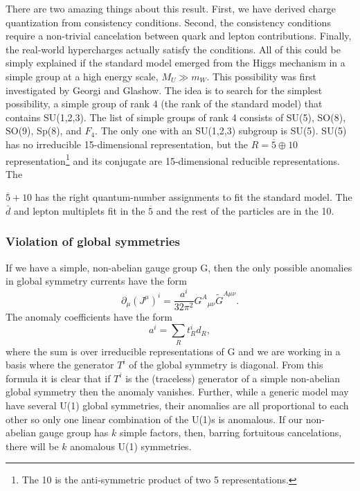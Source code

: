 
There are two amazing things about this result. First, we have derived charge
quantization from consistency conditions. Second, the consistency conditions
require a non-trivial cancelation between quark and lepton contributions.
Finally, the real-world hypercharges actually satisfy the conditions. All of
this could be simply explained if the standard model emerged from the Higgs
mechanism in a simple group at a high energy scale, $M_U\gg m_W$. This
possibility was first investigated by Georgi and Glashow. The idea is to search
for the simplest possibility, a simple group of rank 4 (the rank of the
standard model) that contains SU(1,2,3). The list of simple groups of rank 4
consists of SU(5), SO(8), SO(9), Sp(8), and $F_4$. The only one with an
SU(1,2,3) subgroup is SU(5). SU(5) has no irreducible 15-dimensional
representation, but the $R=\overline{5}\oplus10$ representation\footnote[17]{The
10 is the anti-symmetric product of two 5 representations.} and its
conjugate are 15-dimensional reducible representations. The

${\overline 5}+10$ has the right quantum-number assignments to fit the standard
model. The $\bar d$ and lepton multiplets fit in the $\overline 5$ and the
rest of the particles are in the 10.

\subsubsection{Violation of global symmetries}

If we have a simple, non-abelian gauge group G, then the only possible
anomalies in global symmetry currents have the form
\[
  \partial_\mu(J^\mu)^i=\frac{a^i}{32\pi^2}
  G^A{}_{\mu\nu}\widetilde G^{A\mu\nu} .
\]
The anomaly coefficients have the form
\[
  a^i=\sum_R t_R^i d_R,
\]
where the sum is over irreducible representations of G and we are working in
a basis where the generator $T^i$ of the global symmetry is diagonal. From
this formula it is clear that if $T^i$ is the (traceless) generator of a
simple non-abelian global symmetry then the anomaly vanishes. Further, while a
generic model may have several U(1) global symmetries, their anomalies are all
proportional to each other so only one linear combination of the U(1)s is
anomalous. If our non-abelian gauge group has $k$ simple factors, then,
barring fortuitous cancelations, there will be $k$ anomalous U(1)
symmetries.

